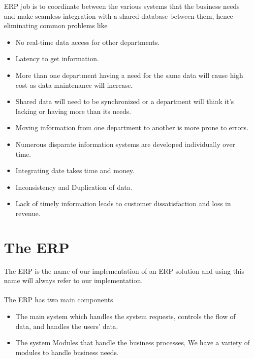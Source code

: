 ERP job is to coordinate between the various systems that the business needs and make seamless integration with a shared database between them, hence eliminating common problems like

\begin{itemize}
    \item No real-time data access for other departments.
    \item Latency to get information.
    \item More than one department having a need for the same data will cause high cost as data maintenance will increase.
    \item Shared data will need to be synchronized or a department will think it’s lacking or having more than its needs.
    \item Moving information from one department to another is more prone to errors.
    \item Numerous disparate information systems are developed individually over time.
    \item Integrating date takes time and money.
    \item Inconsistency and Duplication of data.
    \item Lack of timely information leads to customer dissatisfaction and loss in revenue.
\end{itemize}



\chapter{The ERP}

The ERP is the name of our implementation of an ERP solution and using this name will always refer to our implementation.\\\\
The ERP has two main components
\begin{itemize}
    \item The main system which handles the system requests, controls the flow of data, and handles the users’ data.
    \item The system Modules that handle the business processes, We have a variety of modules to handle business needs.
\end{itemize}


